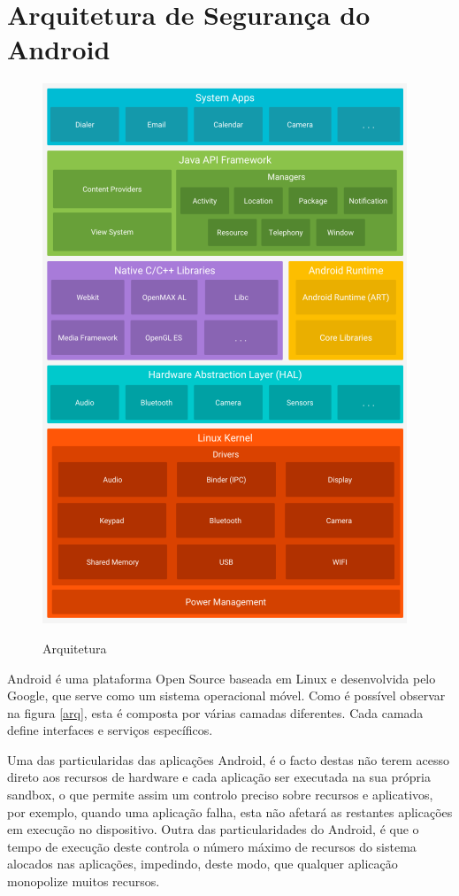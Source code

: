 \documentclass{article}
\begin{document}

\tableofcontents

\newpage
\section{Arquitetura de Segurança do Android}
\begin{figure}[h!]
\centering
\includegraphics[scale=0.6]{arquiteturaAndroid.png}
\label{fig:arq}
\caption{Arquitetura}
\end{figure}

Android é uma plataforma Open Source baseada em Linux e desenvolvida pelo Google, que serve como um sistema operacional móvel.
Como é possível observar na figura \ref{arq}, esta é composta por várias camadas diferentes. Cada camada define interfaces e serviços específicos.


Uma das particularidas das aplicações Android, é o facto destas não terem acesso direto aos recursos de hardware e cada aplicação ser executada na sua própria sandbox, o que permite assim um controlo preciso sobre recursos e aplicativos, por exemplo, quando uma aplicação falha, esta não afetará as restantes aplicações em execução no dispositivo. Outra das particularidades do Android, é que o tempo de execução deste controla o número máximo de recursos do sistema alocados nas aplicações, impedindo, deste modo, que qualquer aplicação monopolize muitos recursos.
\end{document}
